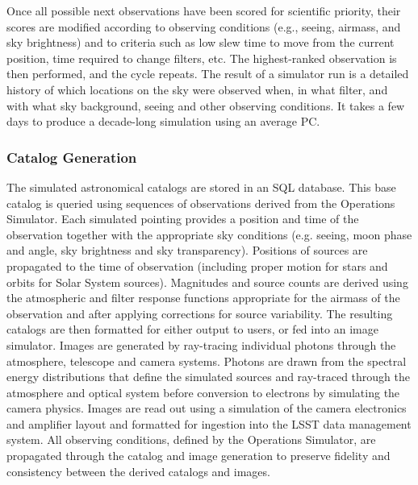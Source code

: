 \documentclass{emulateapj}
\begin{document}
{Once all possible next observations have been scored for scientific
priority, their scores are modified according to observing conditions
(e.g., seeing, airmass, and sky brightness) and to criteria such as
low slew time to move from the current position, time required to
change filters, etc. The highest-ranked observation is then performed,
and the cycle repeats. The result of a simulator run is a detailed
history of which locations on the sky were observed when, in what
filter, and with what sky background, seeing and other observing
conditions.  It takes a few days to produce a decade-long simulation
using an average PC.

\subsubsection{Catalog Generation}

The simulated astronomical catalogs are stored in an SQL
database. This base catalog is queried using sequences of observations
derived from the Operations Simulator. Each simulated
pointing provides a position and time of the observation together with
the appropriate sky conditions (e.g. seeing, moon phase and angle, sky
brightness and sky transparency). Positions of sources are propagated
to the time of observation (including proper motion for stars and
orbits for Solar System sources). Magnitudes and source counts are
derived using the atmospheric and filter response functions
appropriate for the airmass of the observation and after applying
corrections for source variability.  The resulting catalogs are then
formatted for either output to users, or fed into an image
simulator. Images are generated by ray-tracing individual photons
through the atmosphere, telescope and camera systems. Photons are
drawn from the spectral energy distributions that define the simulated
sources and ray-traced through the atmosphere and optical system
before conversion to electrons by simulating the camera physics.
Images are read out using a simulation of the camera electronics and
amplifier layout and formatted for ingestion into the LSST data
management system. All observing conditions, defined by the Operations
Simulator, are propagated through the catalog and image generation to
preserve fidelity and consistency between the derived catalogs and
images.
 
}
\end{document}
